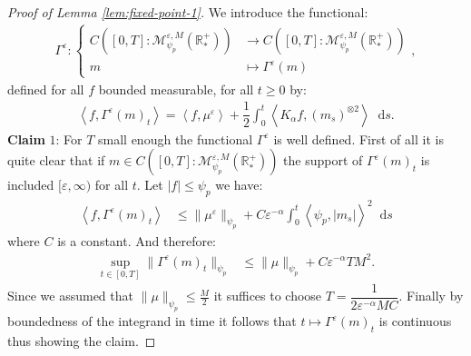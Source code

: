 \documentclass[11pt,a4paper]{article}
\newcommand{\RRP}{\mathbb{R}^+_*}
\newcommand{\MC}{\mathcal{M}}
\newcommand{\brac}[1]{\left\langle#1\right\rangle}
\newcommand{\dd}{\mathop{}\!\mathrm{d}}
\begin{document}
\begin{proof}[Proof of Lemma \ref{lem:fixed-point-1}]
    We introduce the functional:
    \begin{align*}
    \Gamma^\varepsilon : 
    \left\lbrace 
    \begin{aligned}
        C\left([0,T]:\MC^{\varepsilon,M}_{\psi_p}(\RRP) \right) &\to C\left([0,T]:\MC^{\varepsilon,M}_{\psi_p}(\RRP) \right)\\
         m & \mapsto \Gamma^\varepsilon(m)
    \end{aligned}
    \right.,
    \end{align*}
    defined for all $f$ bounded measurable, for all $t \geq 0$ by:
    \begin{align*}
        \brac{f,\Gamma^\varepsilon(m)_t}= \brac{f,\mu^\varepsilon} + \dfrac12\int_0^t \brac{K_\alpha f,\left(m_s\right)^{\otimes 2}} \dd s.
    \end{align*}
    \textbf{Claim} $1$: For $T$ small enough the functional $\Gamma^\varepsilon$ is well defined. First of all it is quite clear that if $m \in C\left([0,T]:\MC^{\varepsilon,M}_{\psi_p}(\RRP) \right)$ the support of $\Gamma^\varepsilon(m)_t$ is included $[\varepsilon,\infty)$ for all $t$. Let $|f| \leq \psi_p$ we have:
    \begin{align*}
        \brac{f,\Gamma^\varepsilon(m)_t} &\leq \|\mu^\varepsilon\|_{\psi_p} + C\varepsilon^{-\alpha}\int_0^t \brac{\psi_p,|m_s|}^2 \dd s 
    \end{align*}
    where $C$ is a constant. And therefore:
    \begin{align*}
        \sup\limits_{t\in [0,T]} \| \Gamma^\varepsilon(m)_t\|_{\psi_p} 
        &\leq \|\mu\|_{\psi_p} + C\varepsilon^{-\alpha} T M^2.
    \end{align*}
    Since we assumed that $\|\mu\|_{\psi_p} \leq \frac{M}{2}$ it suffices to choose $T = \dfrac{1}{2\varepsilon^{-\alpha}MC}$. Finally by boundedness of the integrand in time it follows that $t \mapsto \Gamma^\varepsilon(m)_t$ is continuous thus showing the claim.


\end{proof}
\end{document}
